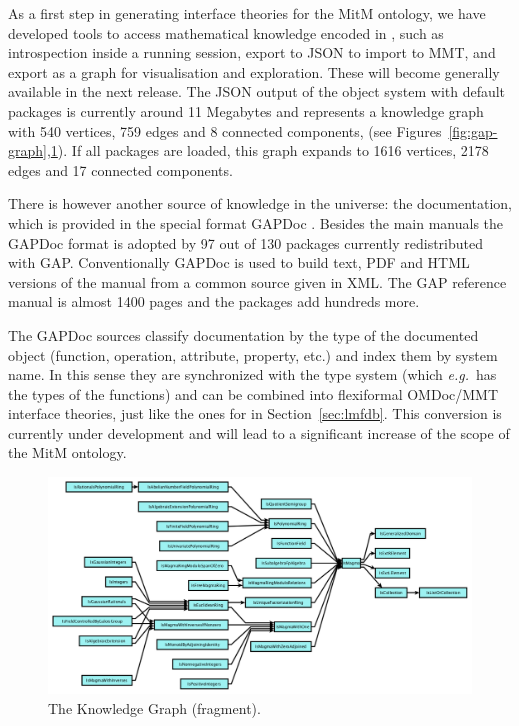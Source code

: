 As a first step in generating interface theories for the MitM ontology, we have developed
tools to access mathematical knowledge encoded in \GAP, such as introspection inside a
running \GAP session, export to JSON to import to MMT, and export as a graph for
visualisation and exploration. These will become generally available in the next \GAP
release. The JSON output of the \GAP object system with default packages is currently
around 11 Megabytes and represents a knowledge graph with 540 vertices, 759 edges and 8 connected
components, (see Figures~\ref{fig:gap-graph},\ref{fig:gap-ismagma}). If all
packages are loaded, this graph expands to 1616 vertices, 2178 edges and 17 connected
components.

There is however another source of knowledge in the \GAP universe: the documentation, which is
provided in the special format GAPDoc \cite{gapdoc}. Besides the main manuals the GAPDoc
format is adopted by 97 out of 130 packages currently redistributed with
GAP. Conventionally GAPDoc is used to build text, PDF and HTML versions of the manual
from a common source given in XML. The GAP reference manual is almost 1400 pages and the
packages add hundreds more.

The GAPDoc sources classify documentation by the type of the documented object (function,
operation, attribute, property, etc.) and index them by system name. In this sense they
are synchronized with the type system (which \emph{e.g.}\ has the types of the functions) and can
be combined into flexiformal OMDoc/MMT interface theories, just like the ones for \LMFDB
in Section~\ref{sec:lmfdb}. This conversion is currently under development and will lead
to a significant increase of the scope of the MitM ontology. 

\begin{figure}[ht]\centering
  \includegraphics[width=\textwidth]{gap-ismagma}
  \caption{The \GAP Knowledge Graph (fragment).\label{fig:gap-ismagma}}
\end{figure}

